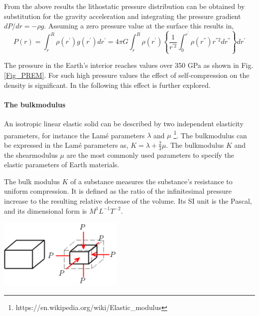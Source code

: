 From the above results the lithostatic pressure distribution can be 
obtained by substitution for the gravity acceleration and 
integrating the pressure gradient $dP/dr = - \rho g$.
Assuming a zero pressure value at the surface this results in,
\begin{equation}
P(r) = \int_r^R \rho(r^{'}) g(r^{'}) dr^{'}
     = 4 \pi G \int_r^R \rho(r^{'}) 
                 \left \{
                      \frac{1}{r^{'2}}
                      \int_0^{r^{'}}
                           \rho(r^{''}) r^{''2} dr^{''}
                 \right \}
               dr^{'}
\label{pressure_integral}
\end{equation}


The pressure in the Earth's interior reaches values over 350 GPa
as shown in Fig. \ref{Fig_PREM}.
For such high pressure values the effect of self-compression 
on the density is significant.
In the following this effect is further explored.

\paragraph{The bulkmodulus}

  An isotropic linear elastic solid can be described by two 
  independent elasticity parameters, for instance the Lam\'{e} parameters
  $\lambda$ and $\mu$ \footnote{https://en.wikipedia.org/wiki/Elastic\_modulus}.
  The bulkmodulus can be expressed in the Lam\'{e} parameters as,
  $K = \lambda + \frac{2}{3}\mu$.
  The bulkmodulus $K$ and the shearmodulus $\mu$ are 
  the most commonly used parameters to specify the 
  elastic parameters of Earth materials.

The bulk modulus $K$ 
of a substance measures the substance's resistance to uniform compression. 
It is defined as the ratio of the infinitesimal pressure increase to the 
resulting relative decrease of the volume. Its SI unit is the Pascal, 
and its dimensional form is $M^1L^{-1}T^{-2}$.

\begin{center}
\includegraphics[width=6cm]{images/gravity/bulkmodulus}
\end{center}


